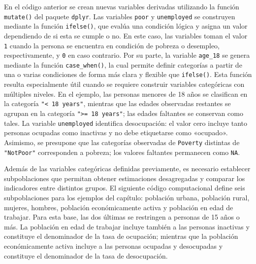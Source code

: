 \documentclass[
  spanish,
  11pt,
  letterpaper,
  oneside,
  open=any]{scrbook}
\begin{document}
En el código anterior se crean nuevas variables derivadas utilizando la
función \texttt{mutate()} del paquete \texttt{dplyr}. Las variables
\texttt{poor} y \texttt{unemployed} se construyen mediante la función
\texttt{ifelse()}, que evalúa una condición lógica y asigna un valor
dependiendo de si esta se cumple o no. En este caso, las variables toman
el valor \texttt{1} cuando la persona se encuentra en condición de
pobreza o desempleo, respectivamente, y \texttt{0} en caso contrario.
Por su parte, la variable \texttt{age\_18} se genera mediante la función
\texttt{case\_when()}, la cual permite definir categorías a partir de
una o varias condiciones de forma más clara y flexible que
\texttt{ifelse()}. Esta función resulta especialmente útil cuando se
requiere construir variables categóricas con múltiples niveles. En el
ejemplo, las personas menores de 18 años se clasifican en la categoría
\texttt{"\textless{}\ 18\ years"}, mientras que las edades observadas
restantes se agrupan en la categoría
\texttt{"\textgreater{}=\ 18\ years"}; las edades faltantes se conservan
como tales. La variable \texttt{unemployed} identifica desocupación: el
valor cero incluye tanto personas ocupadas como inactivas y no debe
etiquetarse como «ocupado». Asimismo, se presupone que las categorías
observadas de \texttt{Poverty} distintas de \texttt{"NotPoor"}
corresponden a pobreza; los valores faltantes permanecen como
\texttt{NA}.

Además de las variables categóricas definidas previamente, es necesario
establecer subpoblaciones que permitan obtener estimaciones desagregadas
y comparar los indicadores entre distintos grupos. El siguiente código
computacional define seis subpoblaciones para los ejemplos del capítulo:
población urbana, población rural, mujeres, hombres, población
económicamente activa y población en edad de trabajar. Para esta base,
las dos últimas se restringen a personas de 15 años o más. La población
en edad de trabajar incluye también a las personas inactivas y
constituye el denominador de la tasa de ocupación; mientras que la
población económicamente activa incluye a las personas ocupadas y
desocupadas y constituye el denominador de la tasa de desocupación.
\end{document}
